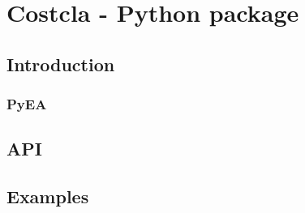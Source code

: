   \chapter{Costcla - Python package}
    \section{Introduction}
      \subsection{PyEA}
    \section{API}
    \section{Examples}